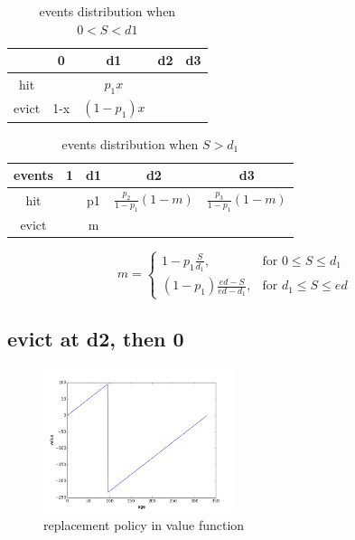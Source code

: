 \documentclass[12pt, letterpaper]{article}
\begin{document}
\begin{table}[H]
\begin{center}
\begin{tabular}{c|c c c c}
\hline
 & 0 & d1 & d2 & d3 \\
 \hline
hit & & $p_1 x$ & \\
evict & 1-x & $(1-p_1) x$ & \\
\end{tabular}
\caption{events distribution when $0<S<d1$}
\end{center}
\end{table}

\begin{table}[H]
\begin{center}
\begin{tabular}{c | c c c c}
\hline
events & 1 & d1 & d2 & d3 \\
\hline
hit & & p1 & $\frac{p_2}{1-p_1} (1-m) $ & $\frac{p_3}{1-p_1} (1-m)$ \\
evict & & m & & \\
\hline
\end{tabular}
\caption{events distribution when $S>d_1$}
\end{center}
\end{table}

\[
m = \left\{\begin{array}{lr}
      1-p_1 \frac{S}{d_1}, & \text{for } 0 \leq S \leq d_1 \\
      (1-p_1) \frac{ed-S}{ed-d_1}, & \text{for } d_1 \leq S \leq ed
           \end{array}
           \right.
\]


\subsection{evict at d2, then 0}

\begin{figure}[H]
\centering
\includegraphics[width=0.5\textwidth]{evict_d2.png}
\caption{replacement policy in value function}
\end{figure}
\end{document}
